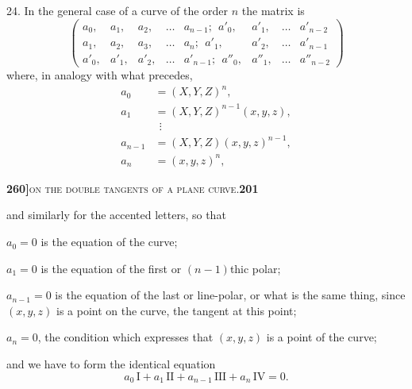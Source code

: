 \documentclass[11pt]{article}
\begin{document}
\medskip

24. In the general case of a curve of the order $n$ the matrix is
\[
\begin{pmatrix}
a_0, & a_1, & a_2, & \ldots & a_{n-1};\ \  a'_0, & a'_1, & \ldots & a'_{n-2}\\
a_1, & a_2, & a_3, & \ldots & a_n;\ \      a'_1, & a'_2, & \ldots & a'_{n-1}\\
a'_0, & a'_1, & a'_2, & \ldots & a'_{n-1};\ \ a''_0, & a''_1, & \ldots & a''_{n-2}
\end{pmatrix}
\]
where, in analogy with what precedes,
\[
\begin{aligned}
a_0 &= (X, Y, Z)^n,\\
a_1 &= (X, Y, Z)^{n-1}(x, y, z),\\
&\ \ \vdots\\
a_{n-1} &= (X, Y, Z)(x, y, z)^{n-1},\\
a_n &= (x, y, z)^n,
\end{aligned}
\]

\newpage

\noindent\textbf{260]}\hfill\textsc{on the double tangents of a plane curve.}\hfill\textbf{201}

\medskip

\noindent and similarly for the accented letters, so that

$a_0 = 0$ is the equation of the curve;

$a_1 = 0$ is the equation of the first or $(n-1)$thic polar;

$a_{n-1} = 0$ is the equation of the last or line-polar, or what is the same thing, since $(x, y, z)$ is a point on the curve, the tangent at this point;

$a_n = 0$, the condition which expresses that $(x, y, z)$ is a point of the curve;

and we have to form the identical equation
\[
a_0\,\mathrm{I} + a_1\,\mathrm{II} + a_{n-1}\,\mathrm{III} + a_n\,\mathrm{IV} = 0.
\]

\medskip
\end{document}
